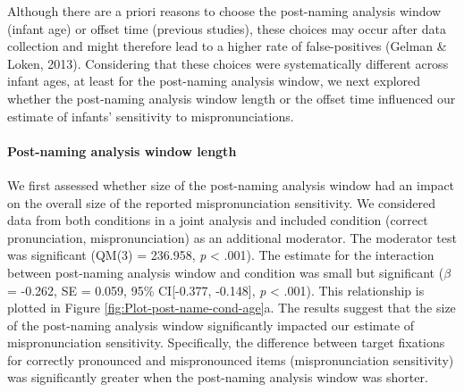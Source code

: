 \documentclass[man]{apa6}
\let\oldparagraph\paragraph
\renewcommand{\paragraph}[1]{\oldparagraph{#1}\mbox{}}
\theoremstyle{definition}
\theoremstyle{definition}
\theoremstyle{definition}
\theoremstyle{remark}
\begin{document}
Although there are a priori reasons to choose the post-naming analysis
window (infant age) or offset time (previous studies), these choices may
occur after data collection and might therefore lead to a higher rate of
false-positives (Gelman \& Loken, 2013). Considering that these choices
were systematically different across infant ages, at least for the
post-naming analysis window, we next explored whether the post-naming
analysis window length or the offset time influenced our estimate of
infants' sensitivity to mispronunciations.

\paragraph{Post-naming analysis window
length}\label{post-naming-analysis-window-length}

We first assessed whether size of the post-naming analysis window had an
impact on the overall size of the reported mispronunciation sensitivity.
We considered data from both conditions in a joint analysis and included
condition (correct pronunciation, mispronunciation) as an additional
moderator. The moderator test was significant (QM(3) = 236.958, \emph{p}
\textless{} .001). The estimate for the interaction between post-naming
analysis window and condition was small but significant (\(\beta\) =
-0.262, SE = 0.059, 95\% CI{[}-0.377, -0.148{]}, \emph{p} \textless{}
.001). This relationship is plotted in Figure
\ref{fig:Plot-post-name-cond-age}a. The results suggest that the size of
the post-naming analysis window significantly impacted our estimate of
mispronunciation sensitivity. Specifically, the difference between
target fixations for correctly pronounced and mispronounced items
(mispronunciation sensitivity) was significantly greater when the
post-naming analysis window was shorter.
\end{document}
